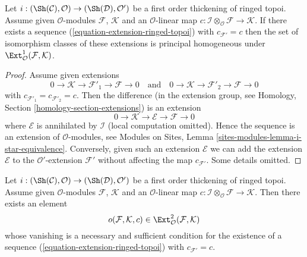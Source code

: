 \begin{lemma}
\label{lemma-inf-ext-ringed-topoi}
Let $i : (\Sh(\mathcal{C}), \mathcal{O}) \to (\Sh(\mathcal{D}), \mathcal{O}')$
be a first order thickening of ringed topoi. Assume given
$\mathcal{O}$-modules $\mathcal{F}$, $\mathcal{K}$
and an $\mathcal{O}$-linear map
$c : \mathcal{I} \otimes_\mathcal{O} \mathcal{F} \to \mathcal{K}$.
If there exists a sequence (\ref{equation-extension-ringed-topoi}) with
$c_{\mathcal{F}'} = c$ then the set of isomorphism classes of these
extensions is principal homogeneous under
$\Ext^1_\mathcal{O}(\mathcal{F}, \mathcal{K})$.
\end{lemma}

\begin{proof}
Assume given extensions
$$
0 \to \mathcal{K} \to \mathcal{F}'_1 \to \mathcal{F} \to 0
\quad\text{and}\quad
0 \to \mathcal{K} \to \mathcal{F}'_2 \to \mathcal{F} \to 0
$$
with $c_{\mathcal{F}'_1} = c_{\mathcal{F}'_2} = c$. Then the difference
(in the extension group, see
Homology, Section \ref{homology-section-extensions})
is an extension
$$
0 \to \mathcal{K} \to \mathcal{E} \to \mathcal{F} \to 0
$$
where $\mathcal{E}$ is annihilated by $\mathcal{I}$ (local computation
omitted). Hence the sequence is an extension of $\mathcal{O}$-modules,
see Modules on Sites, Lemma \ref{sites-modules-lemma-i-star-equivalence}.
Conversely, given such an extension $\mathcal{E}$ we can add the extension
$\mathcal{E}$ to the $\mathcal{O}'$-extension $\mathcal{F}'$ without
affecting the map $c_{\mathcal{F}'}$. Some details omitted.
\end{proof}

\begin{lemma}
\label{lemma-inf-obs-ext-ringed-topoi}
Let $i : (\Sh(\mathcal{C}), \mathcal{O}) \to (\Sh(\mathcal{D}), \mathcal{O}')$
be a first order thickening of ringed topoi. Assume given
$\mathcal{O}$-modules $\mathcal{F}$, $\mathcal{K}$
and an $\mathcal{O}$-linear map
$c : \mathcal{I} \otimes_\mathcal{O} \mathcal{F} \to \mathcal{K}$.
Then there exists an element
$$
o(\mathcal{F}, \mathcal{K}, c) \in
\Ext^2_\mathcal{O}(\mathcal{F}, \mathcal{K})
$$
whose vanishing is a necessary and sufficient condition for the existence
of a sequence (\ref{equation-extension-ringed-topoi})
with $c_{\mathcal{F}'} = c$.
\end{lemma}

